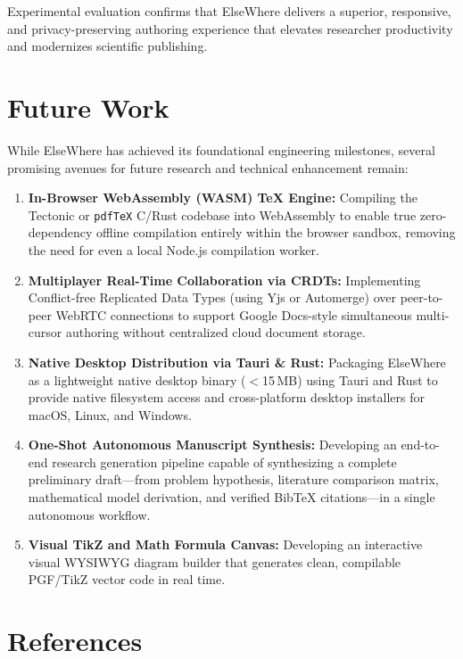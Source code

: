 \documentclass[12pt,a4paper]{article}
\newcommand{\code}[1]{\texttt{#1}}
\newcommand{\frontsection}[1]{%
  \clearpage\phantomsection
  \addcontentsline{toc}{section}{#1}%
  \section*{#1}}
\begin{document}
\noindent Experimental evaluation confirms that ElseWhere delivers a superior, responsive, and privacy-preserving authoring experience that elevates researcher productivity and modernizes scientific publishing.

\clearpage
\section{Future Work}\label{sec:future}

\noindent While ElseWhere has achieved its foundational engineering milestones, several promising avenues for future research and technical enhancement remain:
\begin{enumerate}
    \item \textbf{In-Browser WebAssembly (WASM) TeX Engine:} Compiling the Tectonic or \code{pdfTeX} C/Rust codebase into WebAssembly to enable true zero-dependency offline compilation entirely within the browser sandbox, removing the need for even a local Node.js compilation worker.
    \item \textbf{Multiplayer Real-Time Collaboration via CRDTs:} Implementing Conflict-free Replicated Data Types (using Yjs or Automerge) over peer-to-peer WebRTC connections to support Google Docs-style simultaneous multi-cursor authoring without centralized cloud document storage.
    \item \textbf{Native Desktop Distribution via Tauri \& Rust:} Packaging ElseWhere as a lightweight native desktop binary ($<$15\,MB) using Tauri and Rust to provide native filesystem access and cross-platform desktop installers for macOS, Linux, and Windows.
    \item \textbf{One-Shot Autonomous Manuscript Synthesis:} Developing an end-to-end research generation pipeline capable of synthesizing a complete preliminary draft---from problem hypothesis, literature comparison matrix, mathematical model derivation, and verified Bib\TeX{} citations---in a single autonomous workflow.
    \item \textbf{Visual TikZ and Math Formula Canvas:} Developing an interactive visual WYSIWYG diagram builder that generates clean, compilable PGF/TikZ vector code in real time.
\end{enumerate}

\frontsection{References}
\end{document}
